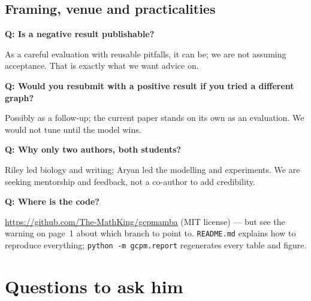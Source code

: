 \documentclass[10.5pt]{article}
\newcommand{\qa}[2]{\par\medskip\noindent\textbf{Q: #1}\par\noindent #2\par}
\begin{document}
\subsection*{Framing, venue and practicalities}
\qa{Is a negative result publishable?}{As a careful evaluation with reusable pitfalls, it can be; we are not
assuming acceptance. That is exactly what we want advice on.}
\qa{Would you resubmit with a positive result if you tried a different graph?}{Possibly as a follow-up; the
current paper stands on its own as an evaluation. We would not tune until the model wins.}
\qa{Why only two authors, both students?}{Riley led biology and writing; Aryan led the modelling and
experiments. We are seeking mentorship and feedback, not a co-author to add credibility.}
\qa{Where is the code?}{\url{https://github.com/The-MathKing/gcpmamba} (MIT license) --- but see the warning on
page~1 about which branch to point to. \texttt{README.md} explains how to reproduce everything;
\texttt{python -m gcpm.report} regenerates every table and figure.}

\section{Questions to ask him}
\end{document}

